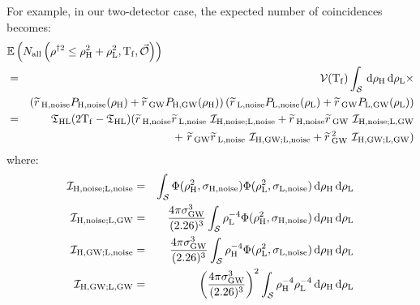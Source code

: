 For example, in our two-detector case, the expected number of coincidences becomes:
\begin{eqnarray}
\label{eqn:slideTerms}
\lefteqn{ \Exptd\left(N_{\mathrm{all}} \left(\rho^{\dagger2} \leq \rho_\varH^2 + \rho_\varL^2, \Tf, \vec{\mathcal{O}} \right) \right) } \nonumber \\
 & = &  \vT(\mathrm{T_f}) \int_\mathcal{S}  \d \rho_\varH \d \rho_\varL \times \nonumber \\
 & & \left(\rsrc_{\varH,\mathrm{noise}}P_{\varH,\mathrm{noise}}(\rho_\varH) + \rsrc_{\mathrm{GW}}P_{\varH,\mathrm{GW}}(\rho_\varH)\right) \left(\rsrc_{\varL,\mathrm{noise}}P_{\varL,\mathrm{noise}}(\rho_\varL) + \rsrc_{\mathrm{GW}}P_{\varL,\mathrm{GW}}(\rho_\varL)\right) \nonumber \\ 
 & = & \coincT_{\varH\varL}(2\Tf - \coincT_{\varH\varL}) ( \rsrc_{\varH,\mathrm{noise}}\rsrc_{\varL,\mathrm{noise}} ~ \mathcal{I}_{\mathrm{H,noise; L,noise}} + \rsrc_{\varH,\mathrm{noise}}\rsrc_{\mathrm{GW}} ~ \mathcal{I}_{\mathrm{H,noise; L,GW}}  \nonumber \\
 & & ~ + ~ \rsrc_{\mathrm{GW}}\rsrc_{\varL,\mathrm{noise}} ~ \mathcal{I}_{\mathrm{H,GW; L,noise}} + \rsrc_{\mathrm{GW}}^2 ~ \mathcal{I}_{\mathrm{H,GW; L,GW}} ) 
\end{eqnarray}
where:
\begin{eqnarray}
\label{eqn:HnoiseLnoiseIntegral}
\mathcal{I}_{\mathrm{H,noise; L,noise}} & = & \int_{\mathcal{S}} \Phi(\rho_{\varH}^2, \sigma_{\varH,\mathrm{noise}})\Phi(\rho_{\varL}^2, \sigma_{\varL,\mathrm{noise}} ) \d \rho_{\varH} \d \rho_{\varL} \\
\label{eqn:HnoiseLgwIntegral}
\mathcal{I}_{\mathrm{H,noise; L,GW}} & = & \frac{4\pi \sigma_{\mathrm{GW}}^3}{(2.26)^3} \int_{\mathcal{S}} \rho_\varL^{-4} \Phi(\rho_{\varH}^2, \sigma_{\varH,\mathrm{noise}}) \d \rho_\varH \d \rho_\varL \\
\label{eqn:HgwLnoiseIntegral}
\mathcal{I}_{\mathrm{H,GW; L,noise}} & = & \frac{4\pi \sigma_{\mathrm{GW}}^3}{(2.26)^3} \int_{\mathcal{S}} \rho_\varH^{-4} \Phi(\rho_{\varL}^2, \sigma_{\varL,\mathrm{noise}}) \d \rho_\varH \d \rho_\varL \\
\label{eqn:HgwLgwIntegral}
\mathcal{I}_{\mathrm{H,GW; L,GW}} & = & \left( \frac{4\pi \sigma_{\mathrm{GW}}^3}{(2.26)^3} \right)^2 \int_{\mathcal{S}} \rho_\varH^{-4} \rho_\varL^{-4} \d \rho_\varH \d \rho_\varL
\end{eqnarray}
